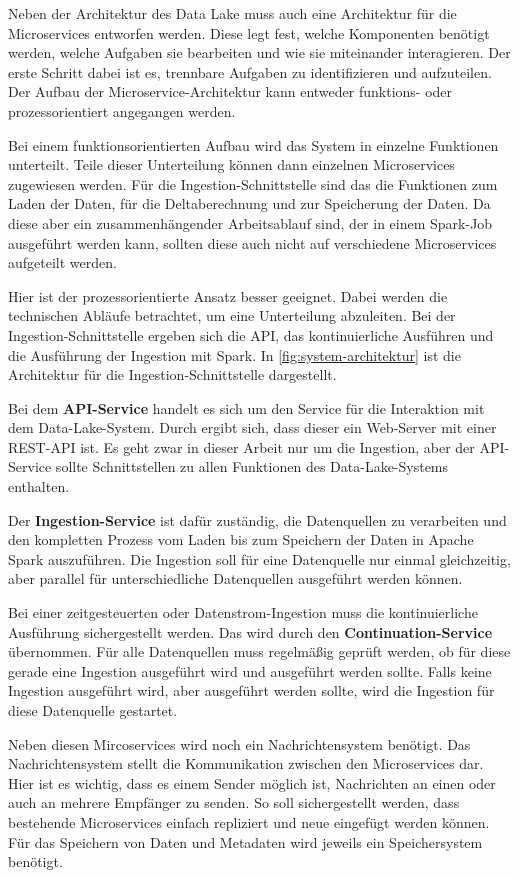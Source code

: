 Neben der Architektur des Data Lake muss auch eine Architektur für die Microservices entworfen werden.
Diese legt fest, welche Komponenten benötigt werden, welche Aufgaben sie bearbeiten und wie sie miteinander interagieren.
Der erste Schritt dabei ist es, trennbare Aufgaben zu identifizieren und aufzuteilen.
Der Aufbau der Microservice-Architektur kann entweder funktions- oder prozessorientiert angegangen werden.

Bei einem funktionsorientierten Aufbau wird das System in einzelne Funktionen unterteilt.
Teile dieser Unterteilung können dann einzelnen Microservices zugewiesen werden.
Für die Ingestion-Schnittstelle sind das die Funktionen zum Laden der Daten, für die Deltaberechnung und zur Speicherung der Daten.
Da diese aber ein zusammenhängender Arbeitsablauf sind, der in einem Spark-Job ausgeführt werden kann, sollten diese auch nicht auf verschiedene Microservices aufgeteilt werden.

Hier ist der prozessorientierte Ansatz besser geeignet.
Dabei werden die technischen Abläufe betrachtet, um eine Unterteilung abzuleiten.
Bei der Ingestion-Schnittstelle ergeben sich die API, das kontinuierliche Ausführen und die Ausführung der Ingestion mit Spark.
In \cref{fig:system-architektur} ist die Architektur für die Ingestion-Schnittstelle dargestellt.

Bei dem \textbf{API-Service} handelt es sich um den Service für die Interaktion mit dem Data-Lake-System.
Durch  ergibt sich, dass dieser ein Web-Server mit einer REST-API ist.
Es geht zwar in dieser Arbeit nur um die Ingestion, aber der API-Service sollte Schnittstellen zu allen Funktionen des Data-Lake-Systems enthalten.

Der \textbf{Ingestion-Service} ist dafür zuständig, die Datenquellen zu verarbeiten und den kompletten Prozess vom Laden bis zum Speichern der Daten in Apache Spark auszuführen.
Die Ingestion soll für eine Datenquelle nur einmal gleichzeitig, aber parallel für unterschiedliche Datenquellen ausgeführt werden können.

Bei einer zeitgesteuerten oder Datenstrom-Ingestion muss die kontinuierliche Ausführung sichergestellt werden.
Das wird durch den \textbf{Continuation-Service} übernommen.
Für alle Datenquellen muss regelmäßig geprüft werden, ob für diese gerade eine Ingestion ausgeführt wird und ausgeführt werden sollte.
Falls keine Ingestion ausgeführt wird, aber ausgeführt werden sollte, wird die Ingestion für diese Datenquelle gestartet.

Neben diesen Mircoservices wird noch ein Nachrichtensystem benötigt.
Das Nachrichtensystem stellt die Kommunikation zwischen den Microservices dar.
Hier ist es wichtig, dass es einem Sender möglich ist, Nachrichten an einen oder auch an mehrere Empfänger zu senden.
So soll sichergestellt werden, dass bestehende Microservices einfach repliziert und neue eingefügt werden können.
Für das Speichern von Daten und Metadaten wird jeweils ein Speichersystem benötigt.

